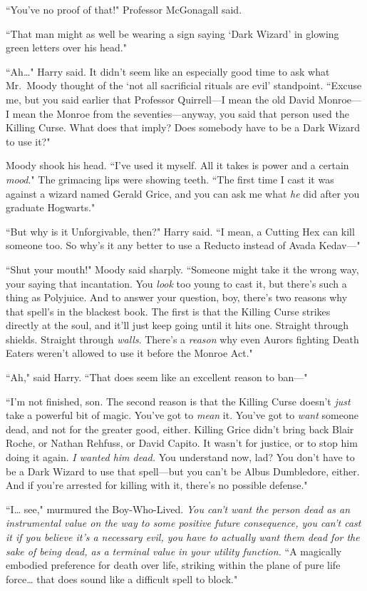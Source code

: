``You've no proof of that!" Professor McGonagall said.

``That man might as well be wearing a sign saying `Dark Wizard' in glowing green letters over his head."

``Ah{\ldots}" Harry said. It didn't seem like an especially good time to ask what Mr.~Moody thought of the `not all sacrificial rituals are evil' standpoint. ``Excuse me, but you said earlier that Professor Quirrell—I mean the old David Monroe—I mean the Monroe from the seventies—anyway, you said that person used the Killing Curse. What does that imply? Does somebody have to be a Dark Wizard to use it?"

Moody shook his head. ``I've used it myself. All it takes is power and a certain \emph{mood}." The grimacing lips were showing teeth. ``The first time I cast it was against a wizard named Gerald Grice, and you can ask me what \emph{he} did after you graduate Hogwarts."

``But why is it Unforgivable, then?" Harry said. ``I mean, a Cutting Hex can kill someone too. So why's it any better to use a Reducto instead of Avada Kedav—"

``Shut your mouth!" Moody said sharply. ``Someone might take it the wrong way, your saying that incantation. You \emph{look} too young to cast it, but there's such a thing as Polyjuice. And to answer your question, boy, there's two reasons why that spell's in the blackest book. The first is that the Killing Curse strikes directly at the soul, and it'll just keep going until it hits one. Straight through shields. Straight through \emph{walls}. There's a \emph{reason} why even Aurors fighting Death Eaters weren't allowed to use it before the Monroe Act."

``Ah," said Harry. ``That does seem like an excellent reason to ban—"

``I'm not finished, son. The second reason is that the Killing Curse doesn't \emph{just} take a powerful bit of magic. You've got to \emph{mean} it. You've got to \emph{want} someone dead, and not for the greater good, either. Killing Grice didn't bring back Blair Roche, or Nathan Rehfuss, or David Capito. It wasn't for justice, or to stop him doing it again. \emph{I wanted him dead.} You understand now, lad? You don't have to be a Dark Wizard to use that spell—but you can't be Albus Dumbledore, either. And if you're arrested for killing with it, there's no possible defense."

``I{\ldots} see," murmured the Boy-Who-Lived. \emph{You can't want the person dead as an instrumental value on the way to some positive future consequence, you can't cast it if you believe it's a necessary evil, you have to actually want them dead for the sake of being dead, as a terminal value in your utility function.} ``A magically embodied preference for death over life, striking within the plane of pure life force{\ldots} that does sound like a difficult spell to block."

